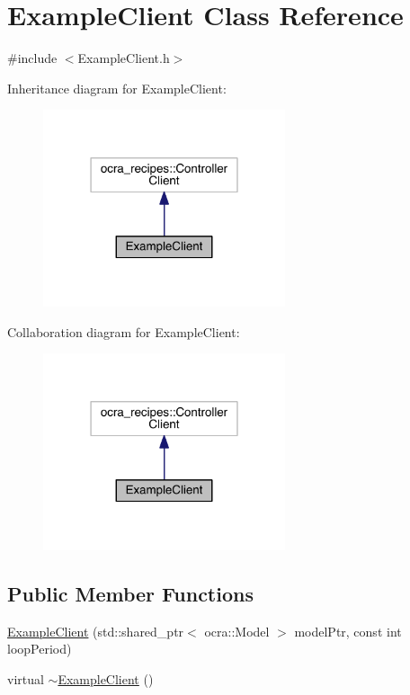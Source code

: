 \hypertarget{classExampleClient}{}\section{Example\+Client Class Reference}
\label{classExampleClient}


{\ttfamily \#include $<$Example\+Client.\+h$>$}



Inheritance diagram for Example\+Client\+:\nopagebreak
\begin{figure}[H]
\begin{center}
\leavevmode
\includegraphics[width=202pt]{classExampleClient__inherit__graph}
\end{center}
\end{figure}


Collaboration diagram for Example\+Client\+:\nopagebreak
\begin{figure}[H]
\begin{center}
\leavevmode
\includegraphics[width=202pt]{classExampleClient__coll__graph}
\end{center}
\end{figure}
\subsection*{Public Member Functions}
\begin{DoxyCompactItemize}
\item 
\hyperlink{classExampleClient_aed7d851662cba1484ecf1db8161d6e62}{Example\+Client} (std\+::shared\+\_\+ptr$<$ ocra\+::\+Model $>$ model\+Ptr, const int loop\+Period)
\item 
virtual \hyperlink{classExampleClient_abdca7dbe5fdab81d7d661a677e5ccd14}{$\sim$\+Example\+Client} ()
\end{DoxyCompactItemize}
